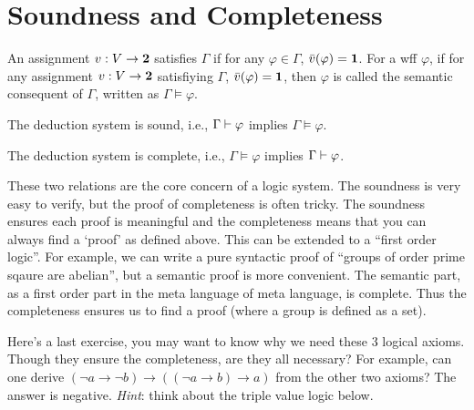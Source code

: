 \section{Soundness and Completeness}
An assignment $v:V\to \mathbf{2}$ satisfies $\Gamma$ if for any $\varphi\in\Gamma$,
$\bar{v}(\varphi)=\mathbf{1}$. For a wff $\varphi$, if for any assignment 
$v:V\to\mathbf{2}$ satisfiying $\Gamma$, $\bar{v}(\varphi)=\mathbf{1}$, then $\varphi$ is
called the semantic consequent of $\Gamma$, written as $\Gamma\models\varphi$.

\begin{theorem}
    The deduction system is sound, i.e., $\Gamma\vdash\varphi$ implies
    $\Gamma\models\varphi$. 
\end{theorem}

\begin{theorem}
    The deduction system is complete, i.e., $\Gamma\models\varphi$ implies
    $\Gamma\vdash\varphi$. 
\end{theorem}

These two relations are the core concern of a logic system. The soundness
is very easy to verify, but the proof of completeness is often tricky.
The soundness ensures each proof is meaningful and the completeness means
that you can always find a `proof' as defined above. This can be extended
to a ``first order logic''. For example, we can write a pure syntactic
proof of ``groups of order prime sqaure are abelian'', but a semantic
proof is more convenient. The semantic part, as a first order part in
the meta language of meta language, is complete. Thus the completeness
ensures us to find a proof (where a group is defined as a set). 

Here's a last exercise, you may want to know why we need these 3
logical axioms. Though they ensure the completeness, are they all
necessary? For example, can one derive 
$(\neg a\to\neg b)\to((\neg a\to b)\to a)$ from the other two axioms? 
The answer is negative. {\it Hint}: think about the triple value logic
below. 

